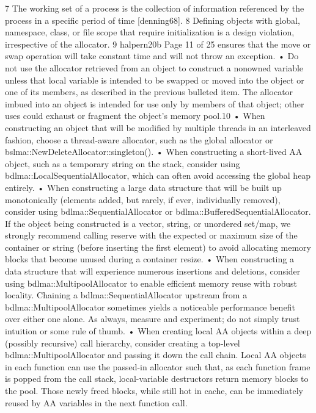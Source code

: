 7 The working set of a process is the collection of information referenced by the process in a
specific period of time [denning68].
8 Defining objects with global, namespace, class, or file scope that require initialization is a
design violation, irrespective of the allocator.
9 halpern20b
Page 11 of 25
ensures that the move or swap operation will take constant time and will
not throw an exception.
• Do not use the allocator retrieved from an object to construct a nonowned
variable unless that local variable is intended to be swapped or moved
into the object or one of its members, as described in the previous
bulleted item. The allocator imbued into an object is intended for use
only by members of that object; other uses could exhaust or fragment the
object’s memory pool.10
• When constructing an object that will be modified by multiple threads in
an interleaved fashion, choose a thread-aware allocator, such as the
global allocator or bslma::NewDeleteAllocator::singleton().
• When constructing a short-lived AA object, such as a temporary string on
the stack, consider using bdlma::LocalSequentialAllocator, which can
often avoid accessing the global heap entirely.
• When constructing a large data structure that will be built up
monotonically (elements added, but rarely, if ever, individually removed),
consider using bdlma::SequentialAllocator or
bdlma::BufferedSequentialAllocator. If the object being constructed is
a vector, string, or unordered set/map, we strongly recommend calling
reserve with the expected or maximum size of the container or string
(before inserting the first element) to avoid allocating memory blocks that
become unused during a container resize.
• When constructing a data structure that will experience numerous
insertions and deletions, consider using bdlma::MultipoolAllocator to
enable efficient memory reuse with robust locality. Chaining a
bdlma::SequentialAllocator upstream from a
bdlma::MultipoolAllocator sometimes yields a noticeable performance
benefit over either one alone. As always, measure and experiment; do not
simply trust intuition or some rule of thumb.
• When creating local AA objects within a deep (possibly recursive) call
hierarchy, consider creating a top-level bdlma::MultipoolAllocator and
passing it down the call chain. Local AA objects in each function can use
the passed-in allocator such that, as each function frame is popped from
the call stack, local-variable destructors return memory blocks to the
pool. Those newly freed blocks, while still hot in cache, can be
immediately reused by AA variables in the next function call.

